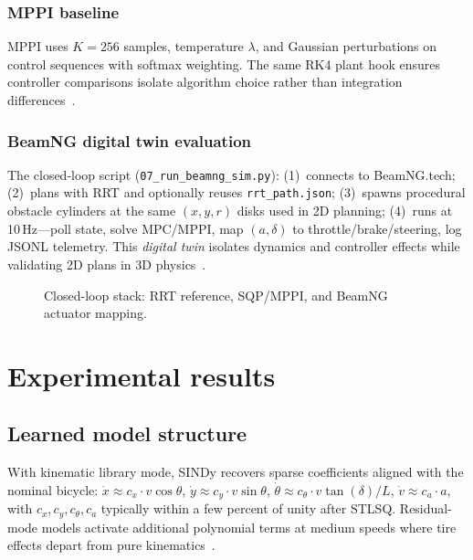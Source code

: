 \documentclass[letterpaper, 10 pt, conference]{ieeeconf}  %
\begin{document}
\subsubsection{MPPI baseline}
MPPI uses $K{=}256$ samples, temperature $\lambda$, and Gaussian perturbations on control sequences with softmax weighting.
The same RK4 plant hook ensures controller comparisons isolate algorithm choice rather than integration differences~\cite{Williams2016MPPI,Williams2017MPPI}.

\subsubsection{BeamNG digital twin evaluation}
The closed-loop script (\texttt{07\_run\_beamng\_sim.py}): (1)~connects to BeamNG.tech; (2)~plans with RRT and optionally reuses \texttt{rrt\_path.json}; (3)~spawns procedural obstacle cylinders at the same $(x, y, r)$ disks used in 2D planning; (4)~runs at 10\,Hz---poll state, solve MPC/MPPI, map $(a,\delta)$ to throttle/brake/steering, log JSONL telemetry.
This \emph{digital twin} isolates dynamics and controller effects while validating 2D plans in 3D physics~\cite{Richter2014,Han2024Dynamics}.

\begin{figure}[t]
  \centering
  \caption{Closed-loop stack: RRT reference, SQP/MPPI, and BeamNG actuator mapping.}
  \label{fig:architecture}
\end{figure}

\section{Experimental results}

\subsection{Learned model structure}

With kinematic library mode, SINDy recovers sparse coefficients aligned with the nominal bicycle:
$\dot{x} \approx c_x \cdot v\cos\theta$,
$\dot{y} \approx c_y \cdot v\sin\theta$,
$\dot{\theta} \approx c_\theta \cdot v\tan(\delta)/L$,
$\dot{v} \approx c_a \cdot a$,
with $c_x, c_y, c_\theta, c_a$ typically within a few percent of unity after STLSQ.
Residual-mode models activate additional polynomial terms at medium speeds where tire effects depart from pure kinematics~\cite{Sathe2024,Han2024Dynamics}.
\end{document}

